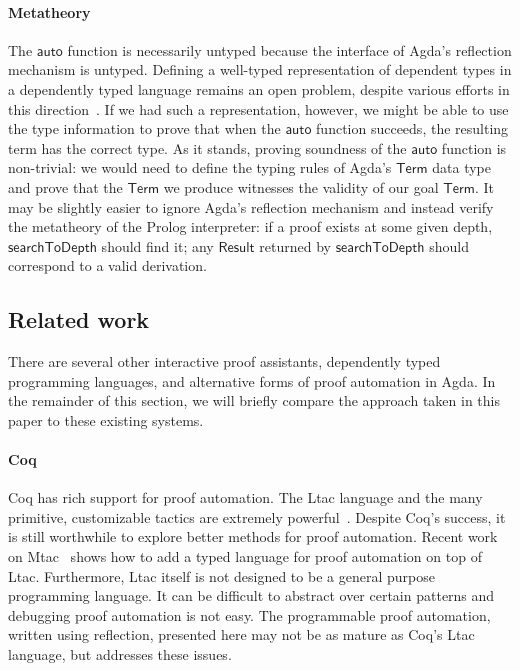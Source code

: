 \documentclass[preprint]{sigplanconf}
\newcommand{\Conid}[1]{\mathit{#1}}
\newcommand{\Varid}[1]{\mathit{#1}}
\renewcommand\Varid[1]{\mathord{\textsf{#1}}}
\let\Conid\Varid
\begin{document}
\paragraph{Metatheory}
The \ensuremath{\Varid{auto}} function is necessarily untyped because the interface of
Agda's reflection mechanism is untyped. Defining a well-typed
representation of dependent types in a dependently typed language
remains an open problem, despite various efforts in this
direction~\cite{james-phd,nisse,devriese,kipling}. If we had such a
representation, however, we might be able to use the type information
to prove that when the \ensuremath{\Varid{auto}} function succeeds, the resulting term
has the correct type. As it stands, proving soundness of the
\ensuremath{\Varid{auto}} function is non-trivial: we would need to define the typing
rules of Agda's \ensuremath{\Conid{Term}} data type and prove that the \ensuremath{\Conid{Term}} we produce
witnesses the validity of our goal \ensuremath{\Conid{Term}}.
It may be slightly easier
to ignore Agda's reflection mechanism and instead verify the
metatheory of the Prolog interpreter: if a proof exists at some given
depth, \ensuremath{\Varid{searchToDepth}} should find it; any \ensuremath{\Conid{Result}} returned by
\ensuremath{\Varid{searchToDepth}} should correspond to a valid derivation.

\subsection*{Related work}

There are several other interactive proof assistants, dependently
typed programming languages, and alternative forms of proof
automation in Agda. In the remainder of this section, we will briefly compare
the approach taken in this paper to these existing systems.

\paragraph{Coq}
Coq has rich support for proof automation. The Ltac language
and the many primitive, customizable tactics are extremely
powerful~\cite{chlipala}. Despite Coq's success, it is still
worthwhile to explore better methods for proof automation. Recent work
on Mtac~\cite{mtac} shows how to add a typed language for proof
automation on top of Ltac. Furthermore, Ltac itself is not designed to
be a general purpose programming language. It can be difficult to
abstract over certain patterns and debugging
proof automation is not easy. The programmable proof automation,
written using reflection, presented here may not be as mature as Coq's
Ltac language, but addresses  these issues.
\end{document}
